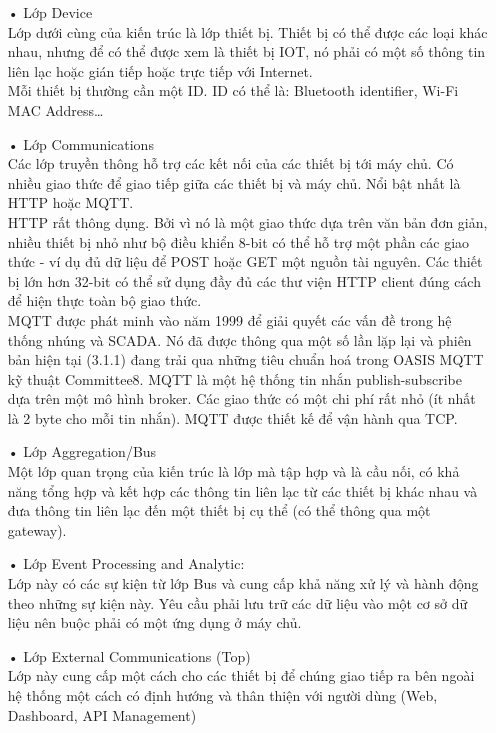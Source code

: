 \begin{itemize}
\item[•]Lớp Device \\
Lớp dưới cùng của kiến trúc là lớp thiết bị. Thiết bị có thể được các loại khác nhau, nhưng để có thể được xem là thiết bị IOT, nó phải có một số thông tin liên lạc hoặc gián tiếp hoặc trực tiếp với Internet.\\
Mỗi thiết bị thường cần một ID. ID có thể là: Bluetooth identifier, Wi-Fi MAC Address…
\item[•]Lớp Communications \\
Các lớp truyền thông hỗ trợ các kết nối của các thiết bị tới máy chủ. Có nhiều giao thức để giao tiếp giữa các thiết bị và máy chủ. Nổi bật nhất là HTTP hoặc MQTT.\\
HTTP rất thông dụng. Bởi vì nó là một giao thức dựa trên văn bản đơn giản, nhiều thiết bị nhỏ như bộ điều khiển 8-bit có thể hỗ trợ một phần các giao thức - ví dụ đủ dữ liệu để POST hoặc GET một nguồn tài nguyên. Các thiết bị lớn hơn 32-bit có thể sử dụng đầy đủ các thư viện HTTP client đúng cách để hiện thực toàn bộ giao thức.\\
MQTT được phát minh vào năm 1999 để giải quyết các vấn đề trong hệ thống nhúng và SCADA. Nó đã được thông qua một số lần lặp lại và phiên bản hiện tại (3.1.1) đang trải qua những tiêu chuẩn hoá trong OASIS MQTT kỹ thuật Committee8. MQTT là một hệ thống tin nhắn publish-subscribe dựa trên một mô hình broker. Các giao thức có một chi phí rất nhỏ (ít nhất là 2 byte cho mỗi tin nhắn). MQTT được thiết kế để vận hành qua TCP.

\item[•]Lớp Aggregation/Bus \\
Một lớp quan trọng của kiến trúc là lớp mà tập hợp và là cầu nối, có khả năng tổng hợp và kết hợp các thông tin liên lạc từ các thiết bị khác nhau và đưa thông tin liên lạc đến một thiết bị cụ thể (có thể thông qua một gateway).
\item[•]Lớp Event Processing and Analytic: \\
Lớp này có các sự kiện từ lớp Bus và cung cấp khả năng xử lý và hành động theo những sự kiện này. Yêu cầu phải lưu trữ các dữ liệu vào một cơ sở dữ liệu nên buộc phải có một ứng dụng ở máy chủ.
\item[•]Lớp External Communications (Top) \\
Lớp này cung cấp một cách cho các thiết bị để chúng giao tiếp ra bên ngoài hệ thống một cách có định hướng và thân thiện với người dùng (Web, Dashboard, API Management)
\end{itemize}

